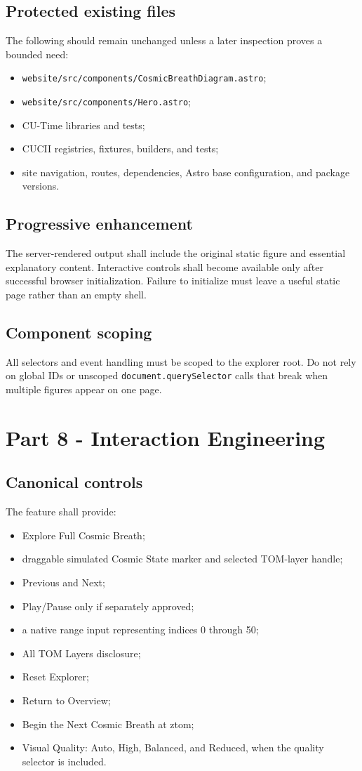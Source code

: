 \documentclass[11pt,letterpaper]{article}
\newcommand{\filepath}[1]{\nolinkurl{#1}}
\begin{document}
\subsection{Protected existing files}
The following should remain unchanged unless a later inspection proves a bounded need:
\begin{itemize}
\item \filepath{website/src/components/CosmicBreathDiagram.astro};
\item \filepath{website/src/components/Hero.astro};
\item CU-Time libraries and tests;
\item CUCII registries, fixtures, builders, and tests;
\item site navigation, routes, dependencies, Astro base configuration, and package versions.
\end{itemize}

\subsection{Progressive enhancement}
The server-rendered output shall include the original static figure and essential explanatory content. Interactive controls shall become available only after successful browser initialization. Failure to initialize must leave a useful static page rather than an empty shell.

\subsection{Component scoping}
All selectors and event handling must be scoped to the explorer root. Do not rely on global IDs or unscoped \texttt{document.querySelector} calls that break when multiple figures appear on one page.

\section{Part 8 - Interaction Engineering}
\subsection{Canonical controls}
The feature shall provide:
\begin{itemize}
\item Explore Full Cosmic Breath;
\item draggable simulated Cosmic State marker and selected TOM-layer handle;
\item Previous and Next;
\item Play/Pause only if separately approved;
\item a native range input representing indices 0 through 50;
\item All TOM Layers disclosure;
\item Reset Explorer;
\item Return to Overview;
\item Begin the Next Cosmic Breath at ztom;
\item Visual Quality: Auto, High, Balanced, and Reduced, when the quality selector is included.
\end{itemize}
\end{document}
